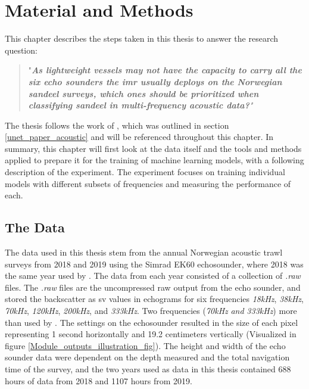 \chapter{Material and Methods} \label{methods}
    This chapter describes the steps taken in this thesis to answer the research question:
        \begin{quote}
        "\textit{\textbf{As lightweight vessels may not have the capacity to carry all the six echo sounders the \gls{imr} usually deploys on the Norwegian sandeel surveys, which ones should be prioritized when classifying sandeel in multi-frequency acoustic data?}"}
        \end{quote}
    
    The thesis follows the work of \citeauthor{brautaset2020acoustic}\cite{brautaset2020acoustic}, which was outlined in section \ref{unet_paper_acoustic} and will be referenced throughout this chapter. In summary, this chapter will first look at the data itself and the tools and methods applied to prepare it for the training of machine learning models, with a following description of the experiment. The experiment focuses on training individual models with different subsets of frequencies and measuring the performance of each.
    
    
    
    
    \section{The Data}
        The data used in this thesis stem from the annual Norwegian acoustic trawl surveys from 2018 and 2019 using the Simrad EK60 echosounder, where 2018 was the same year used by \citet{brautaset2020acoustic}. The data from each year consisted of a collection of \textit{.raw} files. The \textit{.raw} files are the uncompressed raw output from the echo sounder, and stored the backscatter as \gls{sv} values in echograms for six frequencies \textit{18kHz}, \textit{38kHz}, \textit{70kHz}, \textit{120kHz}, \textit{200kHz}, and \textit{333kHz}. Two frequencies (\textit{70kHz} \textit{and} \textit{333kHz}) more than used by \citet{brautaset2020acoustic} . The settings on the echosounder resulted in the size of each pixel representing 1 second horizontally and 19.2 centimeters vertically\cite{choi2021semi} (Visualized in figure \ref{Module_outputs_illustration_fig}). The height and width of the echo sounder data were dependent on the depth measured and the total navigation time of the survey, and the two years used as data in this thesis contained 688 hours of data from 2018 and 1107 hours from 2019.
        
